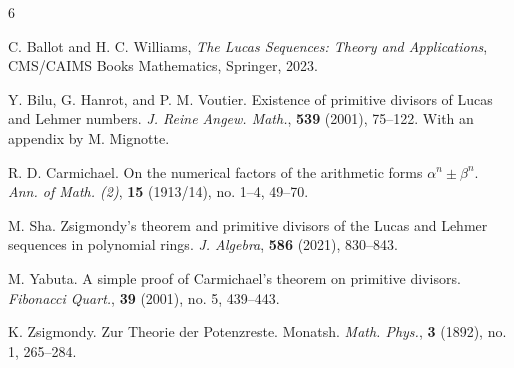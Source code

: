 \documentclass[reqno]{amsart}
\begin{document}
\begin{thebibliography}{6}


 C. Ballot and H. C. Williams, {\it The Lucas Sequences: Theory and Applications}, CMS/CAIMS
Books Mathematics, Springer, 2023.

 Y. Bilu, G. Hanrot, and P. M. Voutier. Existence of primitive divisors of Lucas and Lehmer numbers.
{\it J. Reine Angew. Math.}, {\bf 539} (2001), 75--122. With an appendix by M. Mignotte.

 R. D. Carmichael. On the numerical factors of the arithmetic forms {$\alpha^n\pm\beta^n$}. {\it Ann. of Math. (2)},
{\bf 15} (1913/14), no. 1--4, 49--70.

 M. Sha. Zsigmondy’s theorem and primitive divisors of the Lucas and Lehmer sequences in
polynomial rings. {\it J. Algebra}, {\bf 586} (2021), 830--843.

 M. Yabuta. A simple proof of Carmichael’s theorem on primitive divisors. {\it Fibonacci Quart.},
{\bf 39} (2001), no. 5, 439--443.

 K. Zsigmondy. Zur Theorie der Potenzreste. Monatsh. {\it Math. Phys.}, {\bf 3} (1892), no. 1, 265--284.


\end{thebibliography}
\end{document}
